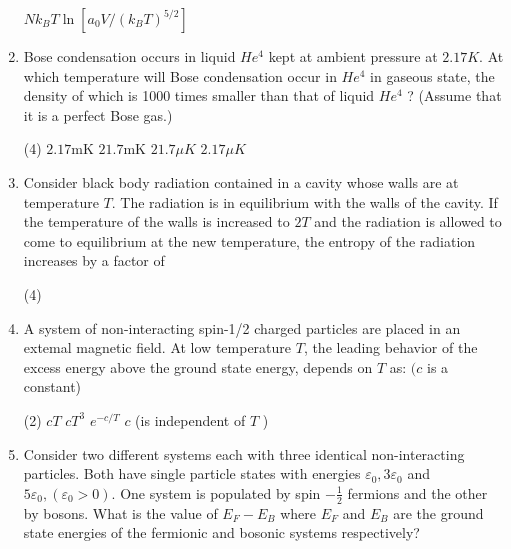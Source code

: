 \begin{enumerate}
\begin{tasks}
		\task[\textbf{D.}] $N k_{B} T \ln \left[a_{0} V /\left(k_{B} T\right)^{5 / 2}\right]$
	\end{tasks}
	\item Bose condensation occurs in liquid $H e^{4}$ kept at ambient pressure at $2.17 K$. At which temperature will Bose condensation occur in $H e^{4}$ in gaseous state, the density of which is 1000 times smaller than that of liquid $H e^{4}$ ? (Assume that it is a perfect Bose gas.)
	{}
	\begin{tasks}(4)
		\task[\textbf{A.}] $2.17 \mathrm{mK}$
		\task[\textbf{B.}] $21.7 \mathrm{mK}$
		\task[\textbf{C.}] $21.7 \mu K$
		\task[\textbf{D.}] $2.17 \mu K$
	\end{tasks}
	\item Consider black body radiation contained in a cavity whose walls are at temperature $T$. The radiation is in equilibrium with the walls of the cavity. If the temperature of the walls is increased to $2 T$ and the radiation is allowed to come to equilibrium at the new temperature, the entropy of the radiation increases by a factor of
	{}
	\begin{tasks}(4)
	\end{tasks}
	\newcommand*{\downuparrow}[1]{\ensuremath{\overset{\uparrow}{#1}}}
	\newcommand*{\downdownarrow}[1]{\ensuremath{\overset{\downarrow}{#1}}}
	\item A system of non-interacting spin-1/2 charged particles are placed in an extemal magnetic field. At low temperature $T$, the leading behavior of the excess energy above the ground state energy, depends on $T$ as: $(c$ is a constant)
	{}
	\begin{tasks}(2)
		\task[\textbf{A.}] $c T$
		\task[\textbf{B.}]  $c T^{3}$
		\task[\textbf{C.}] $e^{-c / T}$
		\task[\textbf{D.}] $c$ (is independent of $T$ )
	\end{tasks}
	\item Consider two different systems each with three identical non-interacting particles. Both have single particle states with energies $\varepsilon_{0}, 3 \varepsilon_{0}$ and $5 \varepsilon_{0},\left(\varepsilon_{0}>0\right)$. One system is populated by spin $-\frac{1}{2}$ fermions and the other by bosons. What is the value of $E_{F}-E_{B}$ where $E_{F}$ and $E_{B}$ are the ground state energies of the fermionic and bosonic systems respectively?
	{}

\end{enumerate}
